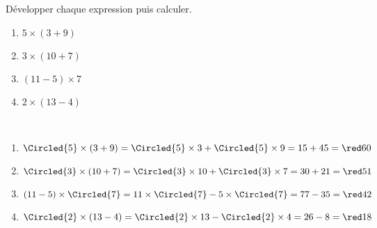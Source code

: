\begin{exercice*} %
   Développer chaque expression puis calculer.
   \begin{enumerate}
      \item $5\times(3+9)$
      \item $3\times(10+7)$
      \item $(11-5)\times7$
      \item $2\times(13-4)$
   \end{enumerate}
\end{exercice*}

\begin{corrige}
   \ \\ [-5mm]
   \begin{enumerate}
      \item $\Circled{5}\times(3+9) =\Circled{5}\times3+\Circled{5}\times9 =15+45 =\red 60$
      \item $\Circled{3}\times(10+7) =\Circled{3}\times10+\Circled{3}\times7 =30+21 =\red 51$
      \item $(11-5)\times\Circled{7} =11\times\Circled{7}-5\times\Circled{7} =77-35 =\red 42$
      \item $\Circled{2}\times(13-4) =\Circled{2}\times13-\Circled{2}\times4 =26-8 =\red 18$
   \end{enumerate}
\end{corrige}
